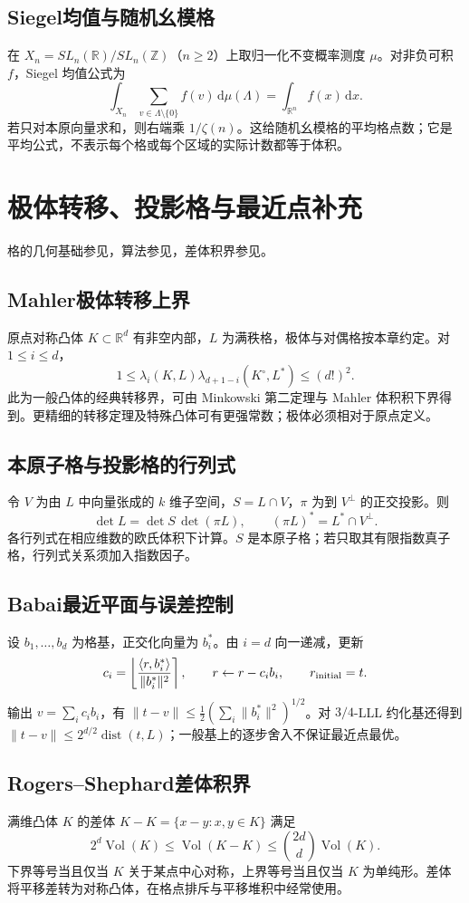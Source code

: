 \documentclass[../main.tex]{subfiles}
\begin{document}
\subsection{Siegel均值与随机幺模格}
在 $X_n=SL_n(\mathbb R)/SL_n(\mathbb Z)$（$n\ge2$）上取归一化不变概率测度 $\mu$。对非负可积 $f$，Siegel 均值公式为
\[
\int_{X_n}\sum_{v\in\Lambda\setminus\{0\}}f(v)\,\mathrm d\mu(\Lambda)
=\int_{\mathbb R^n}f(x)\,\mathrm dx.
\]
若只对本原向量求和，则右端乘 $1/\zeta(n)$。这给随机幺模格的平均格点数；它是平均公式，不表示每个格或每个区域的实际计数都等于体积。

\section{极体转移、投影格与最近点补充}
格的几何基础参见\cite{cassels}，算法参见\cite{lattices}，差体积界参见\cite{schneider}。
\subsection{Mahler极体转移上界}
原点对称凸体 $K\subset\mathbb R^d$ 有非空内部，$L$ 为满秩格，极体与对偶格按本章约定。对 $1\le i\le d$，
\[
1\le\lambda_i(K,L)\lambda_{d+1-i}(K^\circ,L^*)\le(d!)^2.
\]
此为一般凸体的经典转移界，可由 Minkowski 第二定理与 Mahler 体积积下界得到。更精细的转移定理及特殊凸体可有更强常数；极体必须相对于原点定义。
\subsection{本原子格与投影格的行列式}
令 $V$ 为由 $L$ 中向量张成的 $k$ 维子空间，$S=L\cap V$，$\pi$ 为到 $V^\perp$ 的正交投影。则
\[
\det L=\det S\,\det(\pi L),\qquad
(\pi L)^*=L^*\cap V^\perp.
\]
各行列式在相应维数的欧氏体积下计算。$S$ 是本原子格；若只取其有限指数真子格，行列式关系须加入指数因子。
\subsection{Babai最近平面与误差控制}
设 $b_1,\ldots,b_d$ 为格基，正交化向量为 $b_i^*$。由 $i=d$ 向一递减，更新
\[
c_i=\left\lfloor\frac{\langle r,b_i^*\rangle}{\|b_i^*\|^2}\right\rceil,
\qquad r\leftarrow r-c_i b_i,\qquad r_{\rm initial}=t.
\]
输出 $v=\sum_i c_i b_i$，有 $\|t-v\|\le\tfrac12(\sum_i\|b_i^*\|^2)^{1/2}$。对 $3/4$-LLL 约化基还得到 $\|t-v\|\le2^{d/2}\operatorname{dist}(t,L)$；一般基上的逐步舍入不保证最近点最优。
\subsection{Rogers--Shephard差体积界}
满维凸体 $K$ 的差体 $K-K=\{x-y:x,y\in K\}$ 满足
\[
2^d\operatorname{Vol}(K)\le\operatorname{Vol}(K-K)
\le\binom{2d}{d}\operatorname{Vol}(K).
\]
下界等号当且仅当 $K$ 关于某点中心对称，上界等号当且仅当 $K$ 为单纯形。差体将平移差转为对称凸体，在格点排斥与平移堆积中经常使用。
\clearpage
\end{document}
